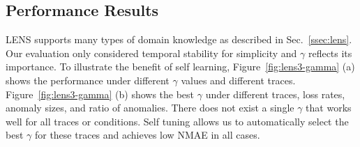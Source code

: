 

\subsection{Performance Results}
\label{ssec:eval-results}

 LENS supports many types of 
domain knowledge as described in Sec.~\ref{ssec:lens}. Our evaluation only
considered temporal stability for simplicity and $\gamma$ reflects its importance. 
To illustrate the benefit of self learning, Figure~\ref{fig:lens3-gamma} (a) shows the performance under
different $\gamma$ values and different traces. Figure~\ref{fig:lens3-gamma} (b) shows 
the best $\gamma$ under different traces, loss rates, anomaly sizes, and ratio of anomalies. 
There does not exist a single $\gamma$ that
works well for all traces or conditions. Self tuning allows us to
automatically select the best $\gamma$ for these traces and achieves
low NMAE in all cases. 


